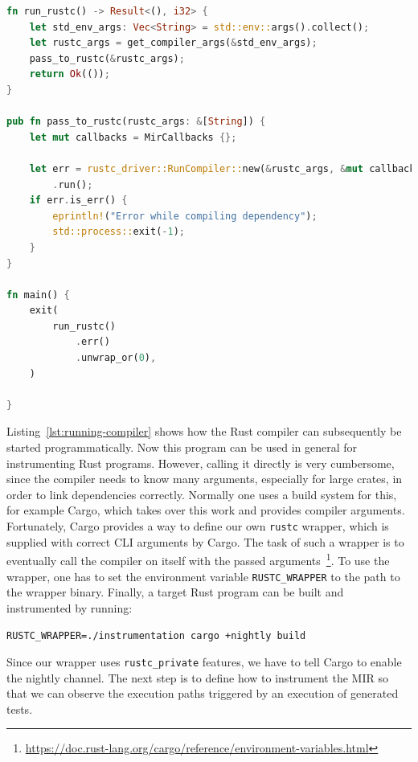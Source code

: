 \documentclass{article}
\begin{document}
\begin{lstlisting}[language=Rust, style=boxed, caption={Running the Rust compiler like a library}, label=lst:running-compiler]
fn run_rustc() -> Result<(), i32> {
    let std_env_args: Vec<String> = std::env::args().collect();
    let rustc_args = get_compiler_args(&std_env_args);
    pass_to_rustc(&rustc_args);
    return Ok(());
}

pub fn pass_to_rustc(rustc_args: &[String]) {
    let mut callbacks = MirCallbacks {};

    let err = rustc_driver::RunCompiler::new(&rustc_args, &mut callbacks)
        .run();
    if err.is_err() {
        eprintln!("Error while compiling dependency");
        std::process::exit(-1);
    }
}

fn main() {
    exit(
        run_rustc()
            .err()
            .unwrap_or(0),
    )

}
\end{lstlisting}

Listing~\ref{lst:running-compiler} shows how the Rust compiler can subsequently be started programmatically. Now this program can be used in general for instrumenting Rust programs. However, calling it directly is very cumbersome, since the compiler needs to know many arguments, especially for large crates, in order to link dependencies correctly. Normally one uses a build system for this, for example Cargo, which takes over this work and provides compiler arguments. Fortunately, Cargo provides a way to define our own \lstinline{rustc} wrapper, which is supplied with correct CLI arguments by Cargo. The task of such a wrapper is to eventually call the compiler on itself with the passed arguments~\footnote{\url{https://doc.rust-lang.org/cargo/reference/environment-variables.html}}. To use the wrapper, one has to set the environment variable \lstinline{RUSTC_WRAPPER} to the path to the wrapper binary. Finally, a target Rust program can be built and instrumented by running:

\lstinline{RUSTC_WRAPPER=./instrumentation cargo +nightly build}

Since our wrapper uses \lstinline{rustc_private} features, we have to tell Cargo to enable the nightly channel. The next step is to define how to instrument the \ac{MIR} so that we can observe the execution paths triggered by an execution of generated tests. 


\end{document}
